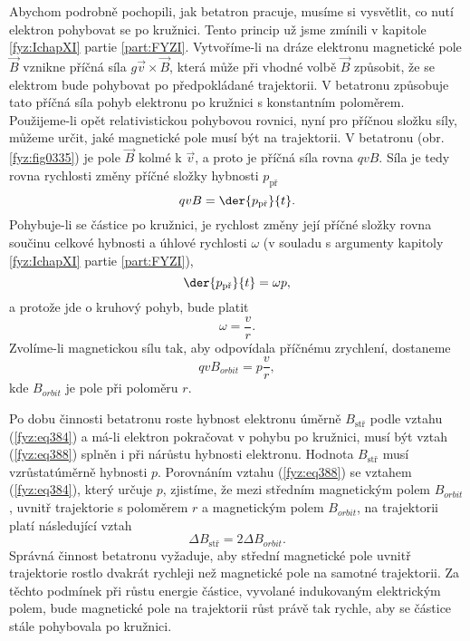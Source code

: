  Abychom podrobně pochopili, jak betatron pracuje, musíme si vysvětlit, co nutí elektron 
  pohybovat se po kružnici. Tento princip už jsme zmínili v kapitole \ref{fyz:IchapXI} partie 
  \ref{part:FYZI}. Vytvoříme-li na dráze elektronu magnetické pole \(\vec{B}\) vznikne příčná síla 
  \(g\vec{v}\times\vec{B}\), která může při vhodné volbě \(\vec{B}\) způsobit, že se elektrom bude 
  pohybovat po předpokládané trajektorii. V betatronu způsobuje tato příčná síla pohyb elektronu 
  po kružnici s konstantním poloměrem. Použijeme-li opět relativistickou pohybovou rovnici, nyní 
  pro příčnou složku síly, můžeme určit, jaké magnetické pole musí být na trajektorii. V betatronu 
  (obr. \ref{fyz:fig0335}) je pole \(\vec{B}\) kolmé k \(\vec{v}\), a proto je příčná síla 
  rovna \(qvB\). Síla je tedy rovna rychlosti změny příčné složky hybnosti \(p_\text{př}\)
  \begin{equation}\label{fyz:eq385}
    qvB = \der{p_{\text{př}}}{t}.
  \end{equation}
  Pohybuje-li se částice po kružnici, je rychlost změny její příčné složky rovna součinu celkové 
  hybnosti a úhlové rychlosti \(\omega\) (v souladu s argumenty kapitoly \ref{fyz:IchapXI} partie 
  \ref{part:FYZI}),
  \begin{equation}\label{fyz:eq386}
    \der{p_{\text{př}}}{t} = \omega p, 
  \end{equation}
  a protože jde o kruhový pohyb, bude platit
  \begin{equation}\label{fyz:eq387}
    \omega = \frac{v}{r}. 
  \end{equation}
  Zvolíme-li magnetickou sílu tak, aby odpovídala příčnému zrychlení, dostaneme
  \begin{equation}\label{fyz:eq388}
    qvB_{orbit} = p\frac{v}{r},
  \end{equation}
  kde \(B_{orbit}\) je pole při poloměru \(r\). 
  
  Po dobu činnosti betatronu roste hybnost elektronu úměrně \(B_{\text{stř}}\) podle vztahu 
  (\ref{fyz:eq384}) a má-li elektron pokračovat v pohybu po kružnici, musí být vztah 
  (\ref{fyz:eq388}) splněn i při nárůstu hybnosti elektronu. Hodnota \(B_{\text{stř}}\) musí 
  vzrůstatúměrně hybnosti \(p\). Porovnáním vztahu (\ref{fyz:eq388}) se vztahem (\ref{fyz:eq384}), 
  který určuje \(p\), zjistíme, že mezi středním magnetickým polem \(B_{orbit}\), uvnitř 
  trajektorie s poloměrem \(r\) a magnetickým polem \(B_{orbit}\), na trajektorii platí následující 
  vztah
  \begin{equation}\label{fyz:eq389}
    \Delta B_{\text{stř}} = 2\Delta B_{orbit}.
  \end{equation}
  Správná činnost betatronu vyžaduje, aby střední magnetické pole uvnitř trajektorie rostlo dvakrát 
  rychleji než magnetické pole na samotné trajektorii. Za těchto podmínek při růstu energie 
  částice, vyvolané indukovaným elektrickým polem, bude magnetické pole na trajektorii růst právě 
  tak rychle, aby se částice stále pohybovala po kružnici. 
  
